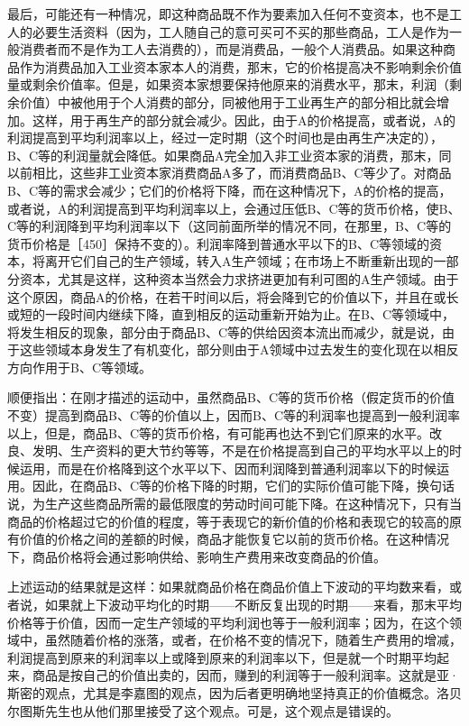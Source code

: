 最后，可能还有一种情况，即这种商品既不作为要素加入任何不变资本，也不是工人的必要生活资料（因为，工人随自己的意可买可不买的那些商品，工人是作为一般消费者而不是作为工人去消费的），而是消费品，一般个人消费品。如果这种商品作为消费品加入工业资本家本人的消费，那末，它的价格提高决不影响剩余价值量或剩余价值率。但是，如果资本家想要保持他原来的消费水平，那末，利润（剩余价值）中被他用于个人消费的部分，同被他用于工业再生产的部分相比就会增加。这样，用于再生产的部分就会减少。因此，由于A的价格提高，或者说，A的利润提高到平均利润率以上，经过一定时期（这个时间也是由再生产决定的），B、C等的利润量就会降低。如果商品A完全加入非工业资本家的消费，那末，同以前相比，这些非工业资本家消费商品A多了，而消费商品B、C等少了。对商品B、C等的需求会减少；它们的价格将下降，而在这种情况下，A的价格的提高，或者说，A的利润提高到平均利润率以上，会通过压低B、C等的货币价格，使B、C等的利润降到平均利润率以下（这同前面所举的情况不同，在那里，B、C等的货币价格是［450］保持不变的）。利润率降到普通水平以下的B、C等领域的资本，将离开它们自己的生产领域，转入A生产领域；在市场上不断重新出现的一部分资本，尤其是这样，这种资本当然会力求挤进更加有利可图的A生产领域。由于这个原因，商品A的价格，在若干时间以后，将会降到它的价值以下，并且在或长或短的一段时间内继续下降，直到相反的运动重新开始为止。在B、C等领域中，将发生相反的现象，部分由于商品B、C等的供给因资本流出而减少，就是说，由于这些领域本身发生了有机变化，部分则由于A领域中过去发生的变化现在以相反方向作用于B、C等领域。

顺便指出：在刚才描述的运动中，虽然商品B、C等的货币价格（假定货币的价值不变）提高到商品B、C等的价值以上，因而B、C等的利润率也提高到一般利润率以上，但是，商品B、C等的货币价格，有可能再也达不到它们原来的水平。改良、发明、生产资料的更大节约等等，不是在价格提高到自己的平均水平以上的时候运用，而是在价格降到这个水平以下、因而利润降到普通利润率以下的时候运用。因此，在商品B、C等的价格下降的时期，它们的实际价值可能下降，换句话说，为生产这些商品所需的最低限度的劳动时间可能下降。在这种情况下，只有当商品的价格超过它的价值的程度，等于表现它的新价值的价格和表现它的较高的原有价值的价格之间的差额的时候，商品才能恢复它以前的货币价格。在这种情况下，商品价格将会通过影响供给、影响生产费用来改变商品的价值。

上述运动的结果就是这样：如果就商品价格在商品价值上下波动的平均数来看，或者说，如果就上下波动平均化的时期——不断反复出现的时期——来看，那末平均价格等于价值，因而一定生产领域的平均利润也等于一般利润率；因为，在这个领域中，虽然随着价格的涨落，或者，在价格不变的情况下，随着生产费用的增减，利润提高到原来的利润率以上或降到原来的利润率以下，但是就一个时期平均起来，商品是按自己的价值出卖的，因而，赚到的利润等于一般利润率。这就是亚·斯密的观点，尤其是李嘉图的观点，因为后者更明确地坚持真正的价值概念。洛贝尔图斯先生也从他们那里接受了这个观点。可是，这个观点是错误的。

